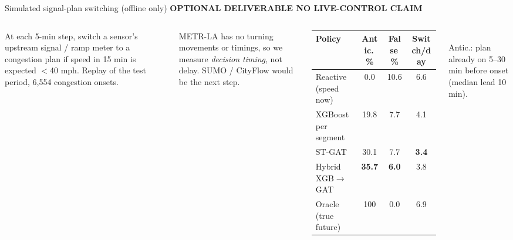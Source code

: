 \documentclass[aspectratio=169,11pt]{beamer}
\newcommand{\kicker}[1]{{\color{accent}\scriptsize\bfseries\MakeUppercase{#1}}\par\vspace{0.3em}}
\newcommand{\aside}[1]{{\color{muted}\footnotesize #1}}
\begin{document}
\begin{frame}{Simulated signal-plan switching (offline only)}
\kicker{Optional deliverable \textperiodcentered{} no live-control claim}
\begin{columns}[T]
\small
At each 5-min step, switch a sensor's upstream signal / ramp meter to a congestion plan if
speed in 15 min is expected $<$40 mph. Replay of the test period, 6,554 congestion onsets.
\vspace{0.6em}

\aside{METR-LA has no turning movements or timings, so we measure \emph{decision timing}, not delay. SUMO / CityFlow would be the next step.}
\footnotesize\setlength{\tabcolsep}{3pt}
\begin{tabular}{lccc}
\toprule
Policy & Antic.\,\% & False\,\% & Switch/day \\
\midrule
Reactive (speed now) & 0.0 & 10.6 & 6.6 \\
XGBoost per segment & 19.8 & 7.7 & 4.1 \\
ST-GAT & 30.1 & 7.7 & \textbf{3.4} \\
Hybrid XGB$\to$GAT & \textbf{35.7} & \textbf{6.0} & 3.8 \\
\midrule
Oracle (true future) & 100 & 0.0 & 6.9 \\
\bottomrule
\end{tabular}\\[0.3em]
\aside{Antic.: plan already on 5--30 min before onset (median lead 10 min).}
\end{columns}
\end{frame}
\end{document}
